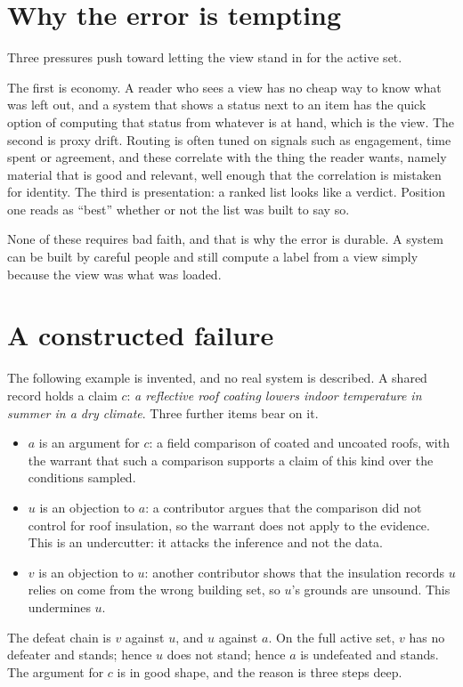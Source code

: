 \documentclass[11pt]{article}
\begin{document}
\section{Why the error is tempting}\label{sec:tempting}

Three pressures push toward letting the view stand in for the active set.

The first is economy. A reader who sees a view has no cheap way to know what was left out, and a system that shows a status next to an item has the quick option of computing that status from whatever is at hand, which is the view. The second is proxy drift. Routing is often tuned on signals such as engagement, time spent or agreement, and these correlate with the thing the reader wants, namely material that is good and relevant, well enough that the correlation is mistaken for identity. The third is presentation: a ranked list looks like a verdict. Position one reads as ``best'' whether or not the list was built to say so.

None of these requires bad faith, and that is why the error is durable. A system can be built by careful people and still compute a label from a view simply because the view was what was loaded.

\section{A constructed failure}\label{sec:failure}

The following example is invented, and no real system is described. A shared record holds a claim $c$: \emph{a reflective roof coating lowers indoor temperature in summer in a dry climate}. Three further items bear on it.
\begin{itemize}[nosep]
\item $a$ is an argument for $c$: a field comparison of coated and uncoated roofs, with the warrant that such a comparison supports a claim of this kind over the conditions sampled.
\item $u$ is an objection to $a$: a contributor argues that the comparison did not control for roof insulation, so the warrant does not apply to the evidence. This is an undercutter: it attacks the inference and not the data.
\item $v$ is an objection to $u$: another contributor shows that the insulation records $u$ relies on come from the wrong building set, so $u$'s grounds are unsound. This undermines $u$.
\end{itemize}
The defeat chain is $v$ against $u$, and $u$ against $a$. On the full active set, $v$ has no defeater and stands; hence $u$ does not stand; hence $a$ is undefeated and stands. The argument for $c$ is in good shape, and the reason is three steps deep.
\end{document}
